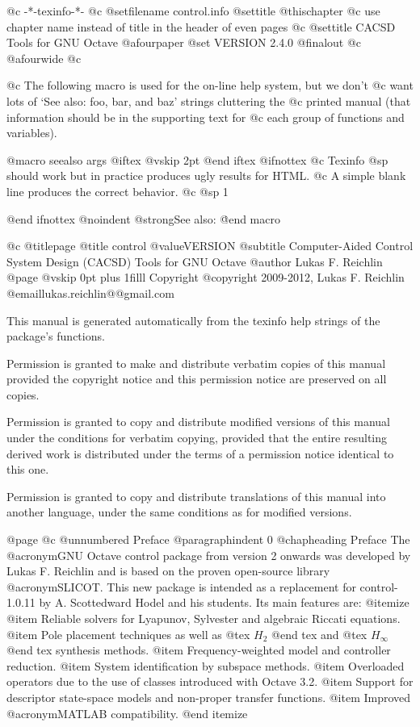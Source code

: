    @c -*-texinfo-*-
@c %
@setfilename control.info
@settitle @thischapter
@c use chapter name instead of title in the header of even pages
@c @settitle CACSD Tools for GNU Octave
@afourpaper
@set VERSION 2.4.0
@finalout
@c @afourwide
@c %


@c The following macro is used for the on-line help system, but we don't
@c want lots of `See also: foo, bar, and baz' strings cluttering the
@c printed manual (that information should be in the supporting text for
@c each group of functions and variables).

@macro seealso {args}
@iftex
@vskip 2pt
@end iftex
@ifnottex
@c Texinfo @sp should work but in practice produces ugly results for HTML.
@c A simple blank line produces the correct behavior. 
@c @sp 1

@end ifnottex
@noindent
@strong{See also:} \args\.
@end macro


@c %
@titlepage
@title control @value{VERSION}
@subtitle Computer-Aided Control System Design (CACSD) Tools for GNU Octave
@author Lukas F. Reichlin
@page
@vskip 0pt plus 1filll
Copyright @copyright{} 2009-2012, Lukas F. Reichlin @email{lukas.reichlin@@gmail.com}

This manual is generated automatically from the texinfo help strings
of the package's functions.

Permission is granted to make and distribute verbatim copies of
this manual provided the copyright notice and this permission notice
are preserved on all copies.

Permission is granted to copy and distribute modified versions of this
manual under the conditions for verbatim copying, provided that the entire
resulting derived work is distributed under the terms of a permission
notice identical to this one.

Permission is granted to copy and distribute translations of this manual
into another language, under the same conditions as for modified versions.


@page
@c @unnumbered Preface
@paragraphindent 0
@chapheading Preface
The @acronym{GNU} Octave control package from version 2 onwards was
developed by Lukas F. Reichlin and is based on the proven open-source
library @acronym{SLICOT}. This new package is intended as a replacement
for control-1.0.11 by A. Scottedward Hodel and his students.
Its main features are:
@itemize
@item Reliable solvers for Lyapunov, Sylvester and algebraic Riccati equations.
@item Pole placement techniques as well as @tex $ H_2 $ @end tex
and @tex $ H_{\infty} $ @end tex
synthesis methods.
@item Frequency-weighted model and controller reduction.
@item System identification by subspace methods.
@item Overloaded operators due to the use of classes introduced with Octave 3.2.
@item Support for descriptor state-space models and non-proper transfer functions.
@item Improved @acronym{MATLAB} compatibility.
@end itemize

